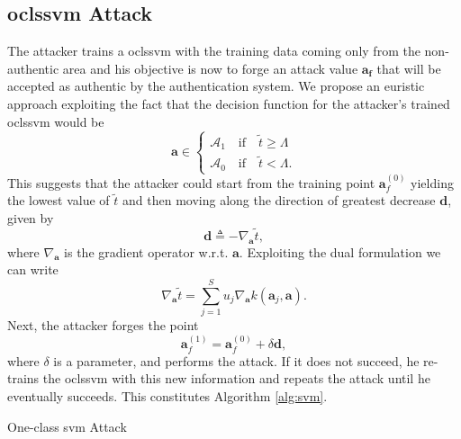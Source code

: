 \documentclass[draftcls,onecolumn,12pt]{IEEEtran}
\newcommand{\wrt}{w.r.t. }
\begin{document}
\subsection{\Acl{oclssvm} Attack}
The attacker trains a \ac{oclssvm} with the training data coming only from the non-authentic area and his objective is now to forge an attack value $\mathbf{a_{f}}$ that will be accepted as authentic by the authentication system. We propose an euristic approach  exploiting the fact that the decision function for the attacker's trained \ac{oclssvm} would be
\begin{equation}
\mathbf{a} \in
	\begin{cases}
		\mathcal{A}_1 \quad \text{if} \quad \tilde{t} \geq \Lambda \\
		\mathcal{A}_0 \quad \text{if} \quad \tilde{t} < \Lambda.
	\end{cases}	
\end{equation} 
This suggests that the attacker could start from the training point $\mathbf{a}_{f}^{(0)}$ yielding the lowest value of $\tilde{t}$ and then moving along the direction of greatest decrease $\mathbf{d}$, given by
\begin{equation}
\label{eq:dDef}
	\mathbf{d} \triangleq - \nabla_{\mathbf{a}} \tilde{t},
\end{equation} 
where $\nabla_{\mathbf{a}}$ is the gradient operator \wrt $\mathbf{a}$. Exploiting the dual formulation \cite{choi2009least} we can write
\begin{equation}
		\nabla_{\mathbf{a}} \tilde{t} = \sum_{j=1}^{S} u_j \nabla_{\mathbf{a}} k(\mathbf{a}_j,\mathbf{a}).
\end{equation}
Next, the attacker forges the point
\begin{equation}
	\mathbf{a}_f^{(1)} = \mathbf{a}_f^{(0)} + \delta \mathbf{d}, 	
\end{equation}
where $\delta$ is a parameter, and performs the attack. If it does not succeed, he re-trains the \ac{oclssvm} with this new information and repeats the attack until he eventually succeeds. This constitutes Algorithm \ref{alg:svm}.

\begin{algorithm}[t]
\label{alg:svm}
  \scriptsize

 

    
 \caption{One-class \ac{svm} Attack}
\end{algorithm}
\end{document}
